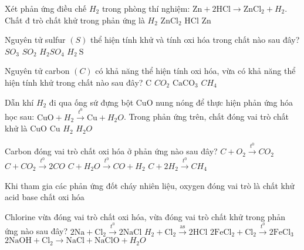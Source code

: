 \begin{ex}Xét phản ứng điều chế $H_2$ trong phòng thí nghiệm: $\mathrm{Zn}+2\mathrm{HCl} \to \mathrm{ZnCl}_2+H_2$. Chất đ trò chất khử trong phản ứng là
	\choice
	{$H_2$}
	{$\mathrm{ZnCl}_2$}
	{\True $\mathrm{HCl}$}
	{$\mathrm{Zn}$}
	\loigiai{}
\end{ex}

\begin{ex}Nguyên tử sulfur $(S)$ thể hiện tính khử và tính oxi hóa trong chất nào sau đây?
	\choice
	{$SO_3$}
	{$SO_2$}
	{$H_2SO_4$}
	{\True $H_2\mathrm{~S}$}
	\loigiai{}
\end{ex}

\begin{ex}Nguyên tử carbon $(C)$ có khả năng thể hiện tính oxi hóa, vừa có khả năng thể hiện tính khử trong chất nào sau đây?
	\choice
	{C}
	{\True $CO_2$}
	{$\mathrm{CaCO}_3$}
	{$CH_4$}
	\loigiai{}
\end{ex}

\begin{ex}Dẫn khí $H_2$ đi qua ống sứ đựng bột $\mathrm{CuO}$ nung nóng để thực hiện phản ứng hóa học sau: $\mathrm{CuO}+H_2\xrightarrow{t^0} \mathrm{Cu}+H_2O$. Trong phản ứng trên, chất đóng vai trò chất khử là
	\choice
	{\True $\mathrm{CuO}$}
	{$\mathrm{Cu}$}
	{$H_2$}
	{$H_2O$}
	\loigiai{}
\end{ex}

\begin{ex}Carbon đóng vai trò chất oxi hóa ở phản ứng nào sau đây?
	\choice
	{$C+O_2\xrightarrow{t^0} CO_2$}
	{$C+CO_2\xrightarrow{t^0} 2CO$}
	{\True $C+H_2O \xrightarrow{t^0} CO+H_2$}
	{$C+2H_2\xrightarrow{t^0} CH_4$}
	\loigiai{}
\end{ex}

\begin{ex}Khi tham gia các phản ứng đốt cháy nhiên liệu, oxygen đóng vai trò là
	\choice
	{\True chất khử}
	{acid}
	{base}
	{chất oxi hóa}
	\loigiai{}
\end{ex}

\begin{ex}Chlorine vừa đóng vai trò chất oxi hóa, vừa đóng vai trò chất khử trong phản ứng nào sau đây?
	\choice
	{$2\mathrm{Na}+\mathrm{Cl}_2\xrightarrow{t^0} 2\mathrm{NaCl}$}
	{$H_2+\mathrm{Cl}_2\xrightarrow{\text {as}} 2\mathrm{HCl}$}
	{$2\mathrm{FeCl}_2+\mathrm{Cl}_2\xrightarrow{t^0} 2\mathrm{FeCl}_3$}
	{\True $2 \mathrm{NaOH}+\mathrm{Cl}_2 \to \mathrm{NaCl}+\mathrm{NaClO}+H_2O$}
	\loigiai{}
\end{ex}

